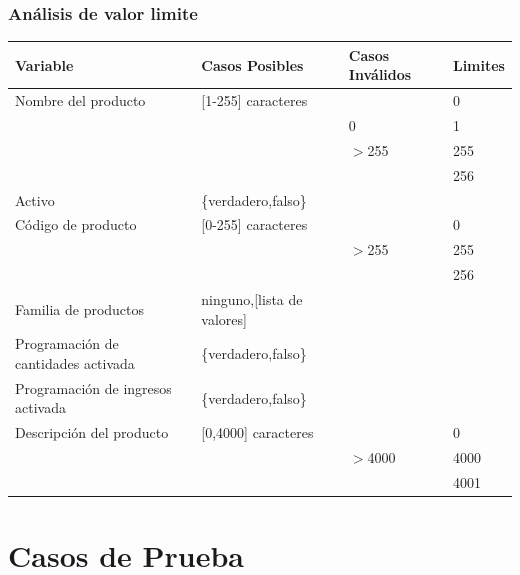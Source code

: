 \documentclass{beamer}
\begin{document}
\begin{frame}
\frametitle{Análisis de valor limite}
\tiny
\begin{table}
\centering
\begin{tabular}{|p{2.6cm}|l|l|l|}
\hline
\footnotesize{\textbf{Variable}} & \footnotesize{\textbf{Casos Posibles}} & \footnotesize{\textbf{Casos Inválidos}} & \footnotesize{\textbf{Limites}} \\
\hline
\footnotesize{Nombre del producto} & \footnotesize{[1-255] caracteres} & & \footnotesize{0} \\
& & \footnotesize{0} & \footnotesize{1} \\
& & \footnotesize{$>$255} & \footnotesize{255} \\
& & & \footnotesize{256} \\
\hline
\footnotesize{Activo} & \footnotesize{\{verdadero,falso\}} & & \\
\hline
\footnotesize{Código de producto} & \footnotesize{[0-255] caracteres} & & \footnotesize{0} \\
& & \footnotesize{$>$255} & \footnotesize{255} \\
& & & \footnotesize{256} \\
\hline
\footnotesize{Familia de productos} & \footnotesize{ninguno,[lista de valores]} & & \\
\hline
\footnotesize{Programación de cantidades activada} & \footnotesize{\{verdadero,falso\}} & & \\
\hline
\footnotesize{Programación de ingresos activada} & \footnotesize{\{verdadero,falso\}} & & \\
\hline
\footnotesize{Descripción del producto} & \footnotesize{[0,4000] caracteres} & & \footnotesize{0} \\
& & \footnotesize{$>$4000} & \footnotesize{4000} \\
& & & \footnotesize{4001} \\
\hline
\end{tabular}
\end{table}
\end{frame}

\section{Casos de Prueba}
\end{document}
